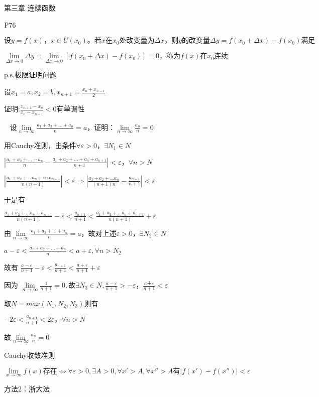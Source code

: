 \documentclass[12pt,a4paper]{article}
\begin{document}
\newcommand{\ntinf}{\lim\limits_{n \to \infty}}
\newcommand{\ntx}[1]{\lim\limits_{n \to #1}}
\newcommand{\xtx}[1]{\lim\limits_{x \to #1}}
\newcommand{\dxtx}[1]{\lim\limits_{\Delta x \to #1}}

第三章 连续函数

P76

$设y=f(x)，x \in U(x_0)。若x在x_0处改变量为\Delta x，则y的改变量\Delta y=f(x_0+\Delta x)-f(x_0)满足$

$\dxtx{0} \Delta y = \dxtx{0}[f(x_0+\Delta x)-f(x_0)]=0，称为f(x)在x_0连续$

p.s.极限证明问题

设$x_1=a,x_2=b,x_{n+1}=\frac{x_n+x_{n-1}}{2}$

证明:$\frac{x_{n+1}-x_n}{x_n-x_{n-1}}<0有单调性$

~
设$\ntinf \frac{a_1+a_2+...+a_n}{n}=a，证明：\ntinf \frac{a_n}{n}=0$

用Cauchy准则，由条件$\forall \varepsilon >0，\exists N_1 \in N$

$|\frac{a_1+a_2+...+a_n}{n}-\frac{a_1+a_2+...+a_n+a_{n+1}}{n+1}|<\varepsilon，\forall n > N$

$|\frac{a_1+a_2+...a_n+n·a_{n+1}}{n(n+1)}|<\varepsilon \Rightarrow |\frac{a_1+a_2+...a_n}{(n+1)n}-\frac{a_{n+1}}{n+1}|<\varepsilon$

于是有

$\frac{a_1+a_2+...a_n+a_{n+1}}{n(n+1)}-\varepsilon < \frac{a_{n+1}}{n+1} < \frac{a_1+a_2+...a_n+a_{n+1}}{n(n+1)} +\varepsilon$

$由\ntinf \frac{a_1+a_2+...+a_n}{n}=a，故对上述\varepsilon > 0，\exists N_2 \in N$

$a-\varepsilon <\frac{a_1+a_2+...+a_n}{n}<a+\varepsilon, \forall n>N_2 $

故有
$\frac{a-\varepsilon}{n+1}-\varepsilon<\frac{a_{n+1}}{n+1}<\frac{a+\varepsilon}{n+1}+\varepsilon$

因为
$\ntinf \frac{1}{n+1}=0,故\exists N_3 \in N,\frac{a-\varepsilon}{n+1}>-\varepsilon，\frac{a＋\varepsilon}{n+1}<\varepsilon$

取$N=max(N_1,N_2,N_3)则有$

$-2\varepsilon<\frac{a_{n+1}}{n+1}<2\varepsilon，\forall n>N$

故$\ntinf \frac{a_n}{n}=0$


Cauchy收敛准则

$\xtx{\infty} f(x)存在 \Leftrightarrow \forall \varepsilon >0,\exists A>0,\forall x'>A,\forall x''>A有|f(x')-f(x'')|<\varepsilon$


方法2：浙大法
\end{document}
